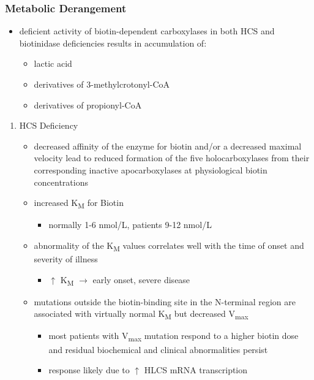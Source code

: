 \documentclass{scrartcl}
\begin{document}
\subsubsection{Metabolic Derangement}
\label{sec:org4c8dad7}
\begin{itemize}
\item deficient activity of biotin-dependent carboxylases in both HCS and
biotinidase deficiencies results in accumulation of:
\begin{itemize}
\item lactic acid
\item derivatives of 3-methylcrotonyl-CoA
\item derivatives of propionyl-CoA
\end{itemize}
\end{itemize}
\begin{enumerate}
\item HCS Deficiency
\label{sec:org39a103f}
\begin{itemize}
\item decreased affinity of the enzyme for biotin and/or a decreased
maximal velocity lead to reduced formation of the five
holocarboxylases from their corresponding inactive apocarboxylases
at physiological biotin concentrations
\item increased K\textsubscript{M} for Biotin
\begin{itemize}
\item normally 1-6 nmol/L, patients 9-12 nmol/L
\end{itemize}
\item abnormality of the K\textsubscript{M} values correlates well with the time of onset
and severity of illness
\begin{itemize}
\item \(\uparrow\) K\textsubscript{M} \(\to\) early onset, severe disease
\end{itemize}

\item mutations outside the biotin-binding site in the N-terminal region
are associated with virtually normal K\textsubscript{M} but decreased V\textsubscript{max}
\begin{itemize}
\item most patients with V\textsubscript{max} mutation respond to a higher biotin
dose and residual biochemical and clinical abnormalities persist
\item response likely due to \(\uparrow\) HLCS mRNA transcription
\end{itemize}
\end{itemize}


\end{enumerate}
\end{document}
